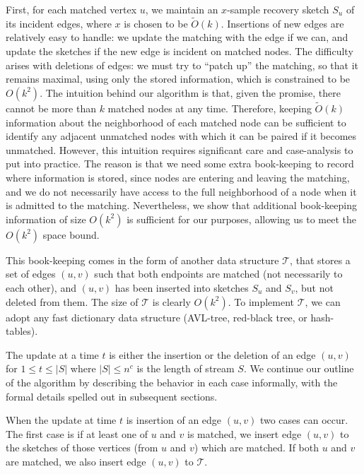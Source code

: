\documentclass[11pt,letter]{article}
\renewcommand{\paragraph}[1]{\medskip \noindent {\bf #1}}
\begin{document}
First, for each matched vertex $u$, we maintain an $x$-sample recovery sketch
$S_u$ of its incident edges, where
$x$ is chosen to be $\tilde{O}(k)$.
Insertions of new edges are relatively easy to handle: we update the
matching with the edge if we can, and update the sketches if the new
edge is incident on matched nodes.
The difficulty arises with deletions of edges: we must try to ``patch
up'' the matching, so that it remains maximal, using only the stored
information, which is constrained to be $O(k^2)$.
The intuition behind our algorithm is that, given the promise, there
cannot be more than $k$ matched nodes at any time.
Therefore, keeping $\tilde{O}(k)$ information about the
neighborhood of each matched node can be sufficient to identify any
adjacent unmatched nodes with which it can be paired if it becomes
unmatched.
However, this intuition requires significant care and case-analysis to
put into practice.
The reason is that we need some extra book-keeping to record where
information is stored, since nodes are entering and leaving the
matching, and we do not necessarily have access to the full
neighborhood of a node when it is admitted to the matching.
Nevertheless, we show that additional book-keeping information of size
$O(k^2)$ is sufficient for our purposes, allowing us to meet the
$O(k^2)$ space bound.

This book-keeping comes in the form of another
data structure $\mathcal{T}$, that
stores a set of edges $(u,v)$ such that both endpoints are matched
(not necessarily to each other),
and $(u,v)$ has been inserted into sketches $S_u$ and $S_v$, but not deleted from them.
The size of $\mathcal{T}$ is clearly $O(k^2)$.
To implement $\mathcal{T}$, we can adopt any fast dictionary data
structure (AVL-tree, red-black tree, or hash-tables).

The update at a time $t$ is either the insertion or the deletion of
an edge $(u,v)$ for $1\le t\le |S|$ where $|S|\le n^c$ is
the length of stream $S$.
We continue our outline of the algorithm by describing the behavior
in each case informally, with the formal details spelled out in
subsequent sections.

\paragraph{Insertion of an Edge $(u,v)$ at Time $t$.}
When the update at time $t$ is insertion of an edge $(u,v)$
two cases can occur.
The first case is if at least one of $u$ and $v$ is matched,
we insert edge $(u,v)$ to the sketches of those vertices (from $u$ and $v$)
which are matched.
If both $u$ and $v$ are matched, we also insert edge $(u,v)$
to $\mathcal{T}$.
\end{document}
